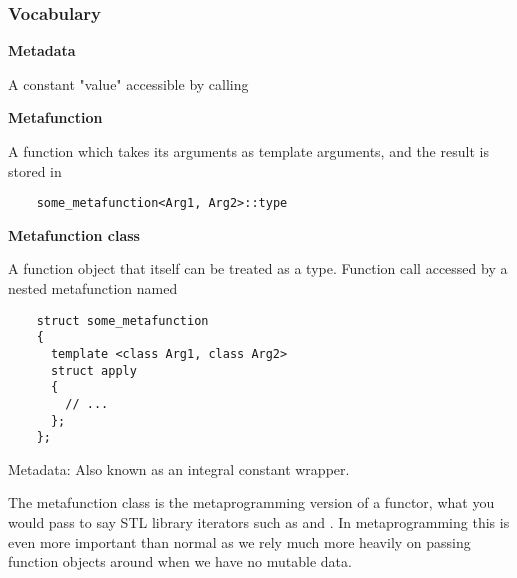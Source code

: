 \documentclass[11pt,a4paper,dvipsnames,usenames]{beamer}
\begin{document}
\begin{frame}[fragile]
  \frametitle{Vocabulary}

  \vfill

  \textbf{Metadata}

  \hfill
  \begin{minipage}{\dimexpr\textwidth-1cm} \small
    A constant "value" accessible by calling 
  \end{minipage}

  \vfill

  \textbf{Metafunction}

  \vspace{10pt}

  \hfill
  \begin{minipage}{\dimexpr\textwidth-1cm} \small
    A function which takes its arguments as template arguments, and the result is stored in 
    \begin{lstlisting}
    some_metafunction<Arg1, Arg2>::type
    \end{lstlisting}
  \end{minipage}

  \vfill

  \textbf{Metafunction class}

  \vspace{10pt}

  \hfill
  \begin{minipage}{\dimexpr\textwidth-1cm} \small
    A function object that itself can be treated as a type. Function call accessed by a nested metafunction named
    \begin{lstlisting}
    struct some_metafunction
    {
      template <class Arg1, class Arg2>
      struct apply
      {
        // ...
      };
    };
    \end{lstlisting}
  \end{minipage}

  \note
  {
    Metadata: Also known as an integral constant wrapper.

    \vspace{1em}

    The metafunction class is the metaprogramming version of a functor, what you would pass to 
    say STL library iterators such as  and . In metaprogramming
    this is even more important than normal as we rely much more heavily on passing function objects around
    when we have no mutable data.
  }

  \vfill

\end{frame}
\end{document}
